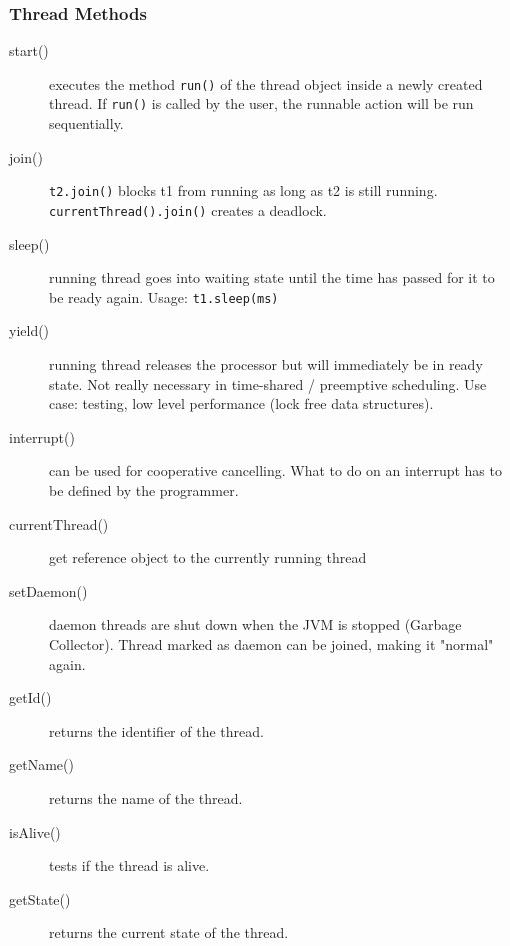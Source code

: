 \subsubsection{Thread Methods}
\begin{description}
  \item[start()] executes the method \texttt{run()} of the thread object inside a newly created thread. If \texttt{run()} is called by the user, the runnable action will be run sequentially.
  \item[join()] \texttt{t2.join()} blocks t1 from running as long as t2 is still running. \texttt{currentThread().join()} creates a deadlock.
  \item[sleep()] running thread goes into waiting state until the time has passed for it to be ready again. Usage: \texttt{t1.sleep(ms)}
  \item[yield()] running thread releases the processor but will immediately be in ready state. Not really necessary in time-shared / preemptive scheduling. Use case: testing, low level performance (lock free data structures).
  \item[interrupt()] can be used for cooperative cancelling. What to do on an interrupt has to be defined by the programmer. 
  \item[currentThread()] get reference object to the currently running thread
  \item[setDaemon()] daemon threads are shut down when the JVM is stopped (Garbage Collector). Thread marked as daemon can be joined, making it "normal" again.
  \item[getId()] returns the identifier of the thread.
  \item[getName()] returns the name of the thread.
  \item[isAlive()] tests if the thread is alive.
  \item[getState()] returns the current state of the thread.
\end{description}
